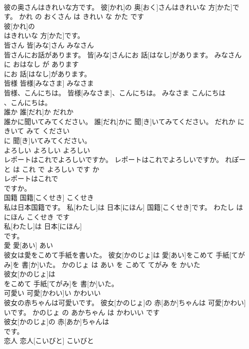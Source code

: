\documentclass[8pt]{extreport}
\begin{document}
\begin{CJK}{UTF8}{min}
\\	彼の奥さんはきれいな方です。	彼[かれ]の 奥[おく]さんはきれいな 方[かた]です。	かれ の おくさん は きれい な かた です	
\\	彼[かれ]の
\\	はきれいな 方[かた]です。			
\\	皆さん	皆[みな]さん	みなさん	
\\	皆さんにお話があります。	皆[みな]さんにお 話[はなし]があります。	みなさん に おはなし が あります	
\\	にお 話[はなし]があります。			
\\	皆様	皆様[みなさま]	みなさま	
\\	皆様、こんにちは。	皆様[みなさま]、こんにちは。	みなさま こんにちは	
\\	、こんにちは。			
\\	誰か	誰[だれ]か	だれか	
\\	誰かに聞いてみてください。	誰[だれ]かに 聞[き]いてみてください。	だれか に きいて みて ください	
\\	に 聞[き]いてみてください。			
\\	よろしい	よろしい	よろしい	
\\	レポートはこれでよろしいですか。	レポートはこれでよろしいですか。	れぽーと は これ で よろしい です か	
\\	レポートはこれで
\\	ですか。			
\\	国籍	国籍[こくせき]	こくせき	
\\	私は日本国籍です。	私[わたし]は 日本[にほん] 国籍[こくせき]です。	わたし は にほん こくせき です	
\\	私[わたし]は 日本[にほん]
\\	です。			
\\	愛	愛[あい]	あい	
\\	彼女は愛をこめて手紙を書いた。	彼女[かのじょ]は 愛[あい]をこめて 手紙[てがみ]を 書[か]いた。	かのじょ は あい を こめて てがみ を かいた	
\\	彼女[かのじょ]は
\\	をこめて 手紙[てがみ]を 書[か]いた。			
\\	可愛い	可愛[かわい]い	かわいい	
\\	彼女の赤ちゃんは可愛いです。	彼女[かのじょ]の 赤[あか]ちゃんは 可愛[かわい]いです。	かのじょ の あかちゃん は かわいい です	
\\	彼女[かのじょ]の 赤[あか]ちゃんは
\\	です。			
\\	恋人	恋人[こいびと]	こいびと	

\end{CJK}
\end{document}
